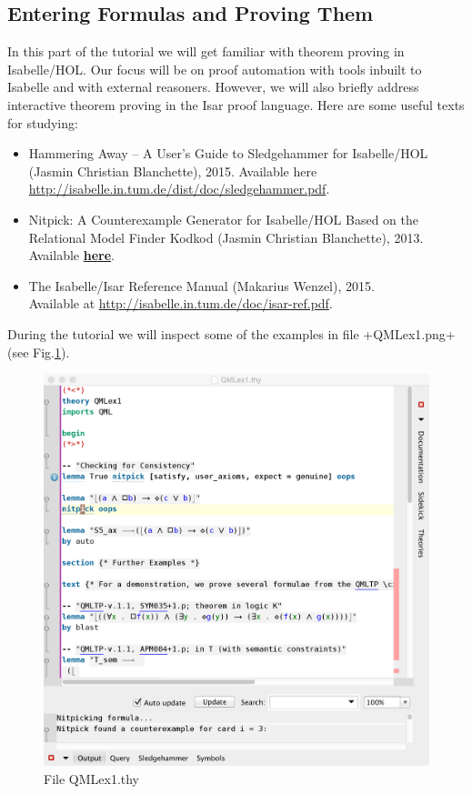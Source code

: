 \documentclass{article}
\begin{document}
\subsection{Entering Formulas and Proving Them}
In this part of the tutorial we will get familiar with theorem proving in
Isabelle/HOL. Our focus will be on proof automation with tools inbuilt
to Isabelle and with external reasoners. However, we will also briefly
address interactive theorem proving in the Isar proof language. Here
are some useful texts for studying:
\begin{itemize}
\item Hammering Away --
A User’s Guide to Sledgehammer for Isabelle/HOL (Jasmin Christian
Blanchette), 2015. Available here
\href{http://isabelle.in.tum.de/dist/doc/sledgehammer.pdf}{http://isabelle.in.tum.de/dist/doc/sledgehammer.pdf}.
\item Nitpick: A Counterexample Generator for Isabelle/HOL Based on
  the Relational Model Finder Kodkod (Jasmin Christian Blanchette),
  2013. Available \href{http://www.easychair.org/publications/paper/Nitpick_A_Counterexample_Generator_for_Isabelle_HOL_Based_on_the_Relational_Model_Finder_Kodkod}{\textbf{here}}.
\item The Isabelle/Isar Reference Manual (Makarius Wenzel),
  2015. \\
Available at \href{http://isabelle.in.tum.de/doc/isar-ref.pdf}{http://isabelle.in.tum.de/doc/isar-ref.pdf}.
\end{itemize}


During the tutorial we will inspect some of the examples in file
+QMLex1.png+ (see Fig.\ref{QMLex1}).
\begin{figure}[t]
\centerline{\includegraphics[width=.7\columnwidth]{./Images/QMLex1.png}}
\caption{File QMLex1.thy} \label{QMLex1}
\end{figure}
\end{document}
